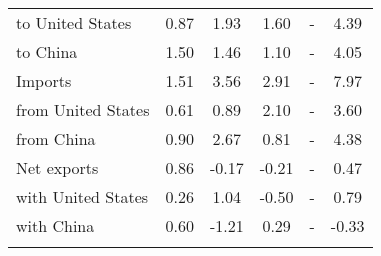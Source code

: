 \begin{tabular}{lccccc}
\quad to United States& 0.87& 1.93& 1.60& -& 4.39\\
\quad to China& 1.50& 1.46& 1.10& -& 4.05\\
Imports& 1.51& 3.56& 2.91& -& 7.97\\
\quad from United States& 0.61& 0.89& 2.10& -& 3.60\\
\quad from China& 0.90& 2.67& 0.81& -& 4.38\\
Net exports& 0.86& -0.17& -0.21& -& 0.47\\
\quad with United States& 0.26& 1.04& -0.50& -& 0.79\\
\quad with China& 0.60& -1.21& 0.29& -& -0.33\\
\\
\bottomrule
\end{tabular}
